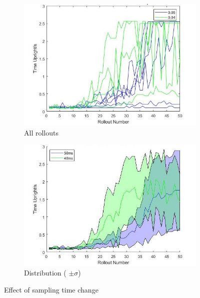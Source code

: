 \documentclass[twoside,twocolumn,12pt]{article}
\begin{document}
\begin{figure}[h!]
  \centering
  \begin{subfigure}[t]{0.5\textwidth}
    \includegraphics[width=\linewidth]{all_ts}
   \caption{All rollouts}
  \label{fig:allts}
  \end{subfigure}
  \newline
  \begin{subfigure}[t]{0.5\textwidth}
    \includegraphics[width=\linewidth]{disp_ts}
    \caption{Distribution ( $\pm \sigma$)}
  \label{fig:dispts}
  \end{subfigure}
  \caption{Effect of sampling time change}
  \label{fig:st}
\end{figure}
\end{document}
